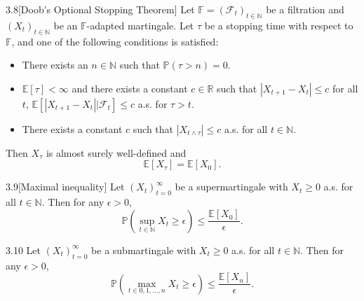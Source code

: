 \documentclass[10pt]{article}
\newenvironment{theorem*}[1]{%
  \IfBlankTF{#1}
    {\renewcommand{\themanualtheoreminner}{\unskip}}
    {\renewcommand\themanualtheoreminner{#1}}%
  \manualtheoreminner
}{\endmanualtheoreminner}
\theoremstyle{definition}
\begin{document}
\begin{theorem*}{3.8}[Doob's Optional Stopping Theorem]
    Let $\mathbb{F} = (\mathcal{F}_t)_{t \in \mathbb{N}}$ be a filtration and $(X_t)_{t \in \mathbb{N}}$ be an $\mathbb{F}$-adapted martingale.
    Let $\tau$ be a stopping time with respect to $\mathbb{F}$,
    and one of the following conditions is satisfied:
    \begin{itemize}
        \item[(a)] There exists an $n \in \mathbb{N}$ such that $\mathbb{P}(\tau > n) = 0$.
        \item[(b)] $\mathbb{E}[\tau] < \infty$ and there exists a constant $c \in \mathbb{R}$ such that $|X_{t+1} - X_t| \leq c$ for all $t$, $\mathbb{E}[|X_{t+1} - X_t| | \mathcal{F}_t] \leq c$ a.s. for $\tau > t$.
        \item[(c)] There exists a constant $c$ such that $|X_{t \wedge \tau}| \leq c$ a.s. for all $t \in \mathbb{N}$.
    \end{itemize}
    Then $X_\tau$ is almost surely well-defined and 
    \begin{equation*}
        \mathbb{E}[X_\tau] = \mathbb{E}[X_0].
    \end{equation*}
\end{theorem*}

\begin{theorem*}{3.9}[Maximal inequality]
    Let $(X_t)_{t=0}^\infty$ be a supermartingale with $X_t \geq 0$ a.s. for all $t \in \mathbb{N}$.
    Then for any $\epsilon > 0$,
    \begin{equation*}
        \mathbb{P} \left( \sup_{t\in\mathbb{N}} X_t \geq \epsilon \right) \leq \frac{\mathbb{E}[X_0]}{\epsilon}.
    \end{equation*}
\end{theorem*}

\begin{theorem*}{3.10}
    Let $(X_t)_{t=0}^\infty$ be a submartingale with $X_t \geq 0$ a.s. for all $t \in \mathbb{N}$.
    Then for any $\epsilon > 0$,
    \begin{equation*}
        \mathbb{P} \left( \max_{t\in {0,1,\ldots,n}} X_t \geq \epsilon \right) \leq \frac{\mathbb{E}[X_n]}{\epsilon}.
    \end{equation*}

\end{theorem*}

\end{document}
